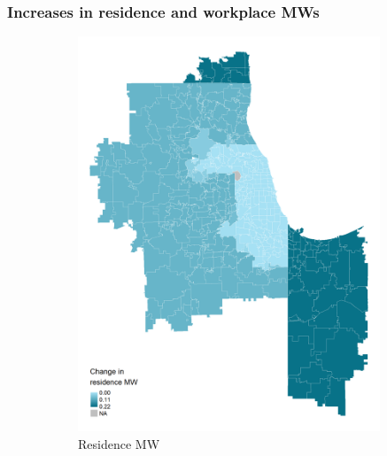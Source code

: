 \documentclass[aspectratio=169, t]{beamer}
\begin{document}
\begin{frame}
    \frametitle{Increases in residence and workplace MWs}
    \begin{figure}
        \begin{subfigure}{0.51\textwidth}
            \includegraphics[width = 0.99\textwidth]{counterfactuals/output/chicago_d_mw_res.png}
            \caption*{Residence MW}
        \end{subfigure}%
        \begin{subfigure}{0.51\textwidth}

\end{subfigure}
\end{figure}
\end{frame}
\end{document}
